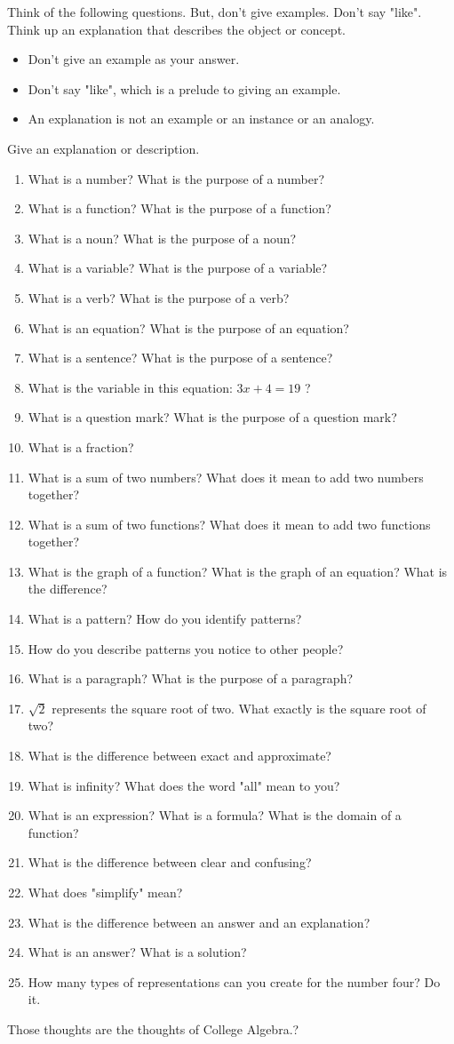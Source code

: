 \documentclass{ximera}
\begin{document}
Think of the following questions. But, don't give examples. Don't say "like". Think up an explanation that describes the object or concept.  
\begin{itemize}
\item Don't give an example as your answer.
\item Don't say "like", which is a prelude to giving an example.
\item An explanation is not an example or an instance or an analogy.
\end{itemize}
Give an explanation or description.

\begin{enumerate}
\item What is a number? What is the purpose of a number?
\item What is a function? What is the purpose of a function?
\item What is a noun? What is the purpose of a noun?
\item What is a variable? What is the purpose of a variable?
\item What is a verb? What is the purpose of a verb?
\item What is an equation? What is the purpose of an equation?
\item What is a sentence? What is the purpose of a sentence?
\item What is the variable in this equation:  $3x+4=19$ ? 
\item What is a question mark? What is the purpose of a question mark?
\item What is a fraction?
\item What is a sum of two numbers? What does it mean to add two numbers together? 
\item What is a sum of two functions? What does it mean to add two functions together?
\item What is the graph of a function? What is the graph of an equation? What is the difference?
\item What is a pattern? How do you identify patterns?
\item How do you describe patterns you notice to other people?
\item What is a paragraph? What is the purpose of a paragraph?
\item $\sqrt{2}$ represents the square root of two. What exactly is the square root of two?
\item What is the difference between exact and approximate?
\item What is infinity? What does the word "all" mean to you?
\item What is an expression?  What is a formula? What is the domain of a function?
\item What is the difference between clear and confusing? 
\item What does "simplify" mean?
\item What is the difference between an answer and an explanation? 
\item What is an answer? What is a solution?
\item How many types of representations can you create for the number four? Do it.
\end{enumerate}



Those thoughts are the thoughts of College Algebra.?
\end{document}
